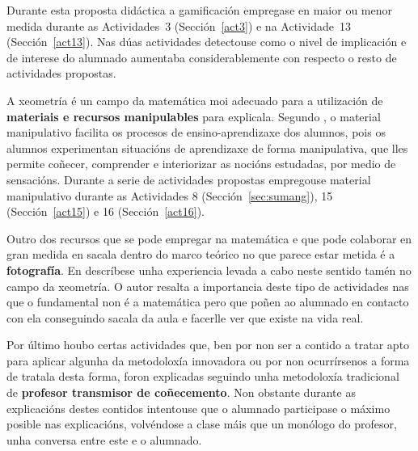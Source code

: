 Durante esta proposta didáctica a gamificación empregase en maior ou menor medida durante as Actividades~3 (Sección~\ref{act3}) e na Actividade~13 (Sección~\ref{act13}). Nas dúas actividades detectouse como o nivel de implicación e de interese do alumnado aumentaba considerablemente con respecto o resto de actividades propostas.

A xeometría é un campo da matemática moi adecuado para a utilización de \textbf{materiais e recursos manipulables} para explicala. Segundo \cite{moreiro2010materiales},  o material manipulativo facilita os procesos de ensino-aprendizaxe dos alumnos, pois os alumnos experimentan situacións de aprendizaxe de forma manipulativa, que lles permite coñecer, comprender e interiorizar as nocións estudadas, por medio de sensacións. Durante a serie de actividades propostas empregouse material manipulativo durante as Actividades 8 (Sección~\ref{sec:sumang}), 15 (Sección~\ref{act15}) e 16 (Sección~\ref{act16}).

Outro dos recursos que se pode empregar na matemática e que pode colaborar en gran medida en sacala dentro do marco teórico no que parece estar metida é a \textbf{fotografía}. En \cite{gonzalez1989fotografia} descríbese unha experiencia levada a cabo neste sentido tamén no campo da xeometría. O autor resalta a importancia deste tipo de actividades nas que o fundamental non é a matemática pero que poñen ao alumnado en contacto con ela conseguindo sacala da aula e facerlle ver que existe na vida real.

Por último houbo certas actividades que, ben por non ser a contido a tratar apto para aplicar algunha da metodoloxía innovadora ou por non ocurrírsenos a forma de tratala desta forma, foron explicadas seguindo unha metodoloxía tradicional de \textbf{profesor transmisor de coñecemento}. Non obstante durante as explicacións destes contidos intentouse que o alumnado participase o máximo posible nas explicacións, volvéndose a clase máis que un monólogo do profesor, unha conversa entre este e o alumnado.

